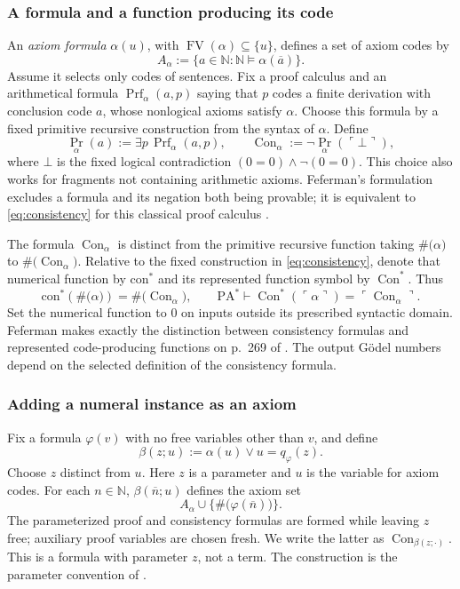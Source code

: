 \documentclass[11pt]{article}
\newcommand{\N}{\mathbb N}
\newcommand{\PA}{\mathrm{PA}^{*}}
\newcommand{\Prf}{\operatorname{Prf}}
\newcommand{\Prov}{\operatorname{Pr}}
\newcommand{\Con}{\operatorname{Con}}
\newcommand{\FV}{\operatorname{FV}}
\newcommand{\code}[1]{\#\bigl(#1\bigr)}
\newcommand{\quo}[1]{\ulcorner #1\urcorner}
\newcommand{\bn}[1]{\overline{#1}}
\newcommand{\defeq}{\mathrel{:=}}
\theoremstyle{definition}
\begin{document}
\subsubsection*{A formula and a function producing its code}
An \emph{axiom formula} $\alpha(u)$, with
$\FV(\alpha)\subseteq\{u\}$, defines a set of axiom codes by
\[
 A_\alpha\defeq\{a\in\N:\N\models\alpha(\bn a)\}.
\]
Assume it selects only codes of sentences. Fix a proof calculus and
an arithmetical formula $\Prf_\alpha(a,p)$ saying that $p$ codes a
finite derivation with conclusion code $a$, whose nonlogical axioms
satisfy $\alpha$. Choose this formula by a fixed primitive recursive
construction from the syntax of $\alpha$. Define
\begin{equation}\label{eq:consistency}
 \Prov_\alpha(a)\defeq\exists p\,\Prf_\alpha(a,p),\qquad
 \Con_\alpha\defeq\neg\Prov_\alpha(\quo\bot),
\end{equation}
where $\bot$ is the fixed logical contradiction
$(0=0)\land\neg(0=0)$. This choice also works for fragments not
containing arithmetic axioms. Feferman's formulation excludes a
formula and its negation both being provable; it is equivalent to
\eqref{eq:consistency} for this classical proof calculus
\cite[\S2(c), p.~269]{F62}.

The formula $\Con_\alpha$ is distinct from the primitive recursive
function taking $\code\alpha$ to $\code{\Con_\alpha}$. Relative to
the fixed construction in \eqref{eq:consistency}, denote that numerical
function by $\mathrm{con}^{*}$ and its represented function symbol by
$\Con^{*}$. Thus
\begin{equation}\label{eq:con-star}
 \mathrm{con}^{*}(\code\alpha)=\code{\Con_\alpha},
 \qquad
 \PA\vdash\Con^{*}(\quo\alpha)=\quo{\Con_\alpha}.
\end{equation}
Set the numerical function to $0$ on inputs outside its prescribed
syntactic domain. Feferman makes exactly the distinction between
consistency formulas and represented code-producing functions on
p.~269 of \cite{F62}. The output G\"odel numbers depend on the selected
definition of the consistency formula.

\subsubsection*{Adding a numeral instance as an axiom}
Fix a formula $\varphi(v)$ with no free variables other than $v$,
and define
\begin{equation}\label{eq:beta}
 \beta(z;u)\defeq\alpha(u)\lor u=q_\varphi(z).
\end{equation}
Choose $z$ distinct from $u$. Here $z$ is a parameter and $u$ is
the variable for axiom codes.
For each $n\in\N$, $\beta(\bn n;u)$ defines the axiom set
\[
  A_\alpha\cup\{\code{\varphi(\bn n)}\}.
\]
The parameterized proof and consistency formulas are formed while
leaving $z$ free; auxiliary proof variables are chosen fresh.
We write the latter as $\Con_{\beta(z;\cdot)}$.
This is a formula with parameter $z$, not a term. The construction is
the parameter convention of \cite[\S2(c), p.~270]{F62}.
\end{document}
